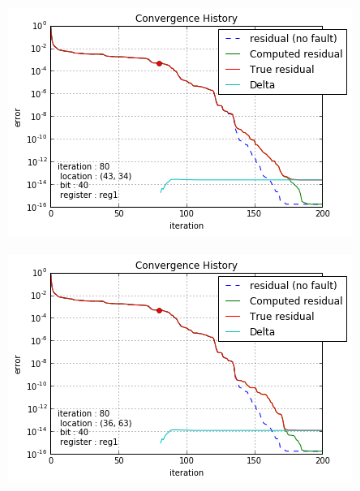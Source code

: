 \begin{figure}[h]
    \begin{minipage}[b]{0.48\linewidth}
	\begin{subfigure}[t]{\linewidth}
		\centering
		\includegraphics[width=\linewidth]{figures/gre_216a/convergence_history_location_0.png}
		\caption{}\label{fig:gre_216a_conv_hist_location_0}		
	\end{subfigure}
	\quad
	\begin{subfigure}[t]{\linewidth}
		\centering
		\includegraphics[width=\linewidth]{figures/gre_216a/convergence_history_location_1.png}
		\caption{}\label{fig:gre_216a_conv_hist_location_1}
	\end{subfigure}
    \quad
    \begin{subfigure}[t]{\linewidth}
		\centering

\end{subfigure}
\end{minipage}
\end{figure}
